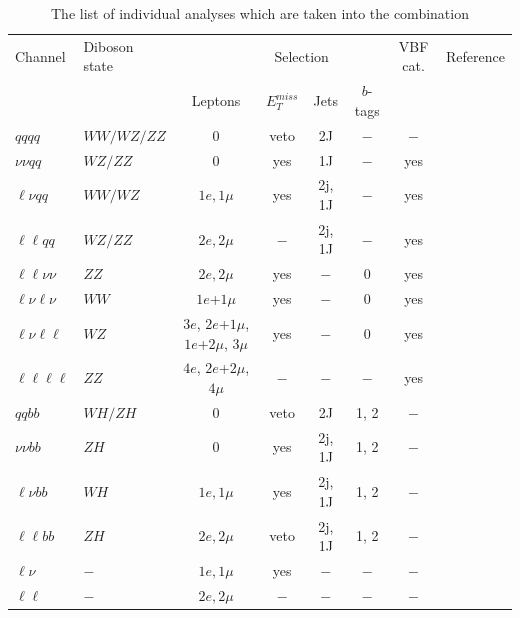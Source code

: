 \begin{table}[t]
	\caption{The list of individual analyses which are taken into the combination}
	\begin{center}
		\begin{tabular}{l l c c c c c c}
			\hline
			Channel            & Diboson state & \multicolumn{4}{c}{~~~~~~Selection}       & VBF cat. & Reference \\
			&               & Leptons       & $E^{miss}_T$  & Jets   & $b$-tags &          &           \\
			\hline
			$qq qq$            & $WW/WZ/ZZ$    & 0             & veto  & 2J     & $-$      & $-$      & \cite{EXOT-2016-19} \\
			$\nu\nu qq$        & $WZ/ZZ$       & 0             & yes   & 1J     & $-$      & yes      & \cite{EXOT-2016-29} \\
			$\ell\nu qq$       & $WW/WZ$       & $1e, 1\mu$    & yes   & 2j, 1J & $-$      & yes      & \cite{EXOT-2016-28} \\
			$\ell\ell qq$      & $WZ/ZZ$       & $2e, 2\mu$    & $-$   & 2j, 1J & $-$      & yes      & \cite{EXOT-2016-29} \\
			$\ell\ell\nu\nu$   & $ZZ$          & $2e, 2\mu$    & yes   & $-$    & 0        & yes      & \cite{HIGG-2016-19} \\
			$\ell\nu\ell\nu$   & $WW$          & $1e$+$1\mu$   & yes   & $-$    & 0        & yes      & \cite{HIGG-2016-31} \\
			$\ell\nu\ell\ell$  & $WZ$          & $3e$, $2e$+$1\mu$, $1e$+$2\mu$, $3\mu$ & yes & $-$ & 0 & yes & \cite{EXOT-2016-11} \\
			$\ell\ell\ell\ell$ & $ZZ$          & $4e$, $2e$+$2\mu$, $4\mu$ & $-$ & $-$ & $-$ & yes    & \cite{HIGG-2016-19} \\
			\hline
			$qq bb$            & $WH/ZH$       & 0             & veto  & 2J     & 1, 2     & $-$      & \cite{EXOT-2016-12} \\
			$\nu\nu bb$        & $ZH$          & 0             & yes   & 2j, 1J & 1, 2     & $-$      & \cite{EXOT-2016-10} \\
			$\ell\nu bb$       & $WH$          & $1e, 1\mu$    & yes   & 2j, 1J & 1, 2     & $-$      & \cite{EXOT-2016-10} \\
			$\ell\ell bb$      & $ZH$          & $2e, 2\mu$    & veto  & 2j, 1J & 1, 2     & $-$      & \cite{EXOT-2016-10} \\
			\hline
			$\ell\nu$          & $-$           & $1e, 1\mu$    & yes   & $-$    & $-$      & $-$      & \cite{EXOT-2016-06} \\
			$\ell\ell$         & $-$           & $2e, 2\mu$    & $-$   & $-$    & $-$      & $-$      & \cite{EXOT-2016-05} \\
			\hline
		\end{tabular}
		\label{tab:signatures}
	\end{center}
\end{table}


